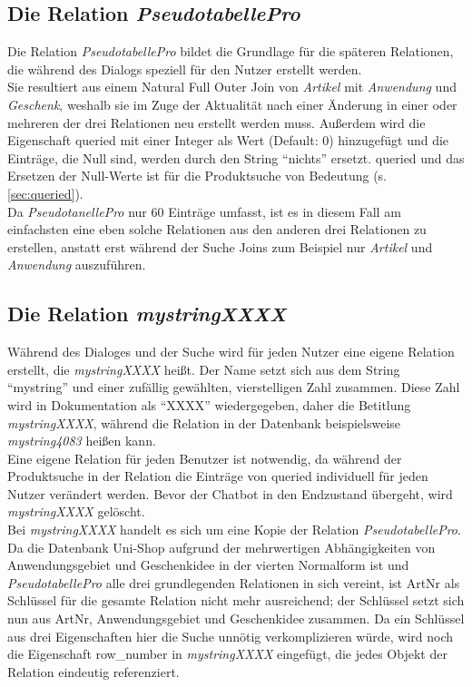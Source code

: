\subsection{Die Relation \textit{PseudotabellePro}}
\label{sec:PseudotabellePro}
Die Relation \textit{PseudotabellePro} bildet die Grundlage für die späteren Relationen, die während des Dialogs speziell für den Nutzer erstellt werden.\\
Sie resultiert aus einem Natural Full Outer Join von \textit{Artikel} mit \textit{Anwendung} und \textit{Geschenk}, weshalb sie im Zuge der Aktualität nach einer Änderung in einer oder mehreren der drei Relationen neu erstellt werden muss. Außerdem wird die Eigenschaft queried mit einer Integer als Wert (Default: 0) hinzugefügt  und die Einträge, die Null sind, werden durch den String "`nichts"' ersetzt. queried und das Ersetzen der Null-Werte ist für die Produktsuche von Bedeutung (s. \ref{sec:queried}).\\
Da \textit{PseudotanellePro} nur 60 Einträge umfasst, ist es in diesem Fall am einfachsten eine eben solche Relationen aus den anderen drei Relationen zu erstellen, anstatt erst während der Suche Joins zum Beispiel nur \textit{Artikel} und \textit{Anwendung} auszuführen.\\


\subsection{Die Relation \textit{mystringXXXX}}
\label{sec:mystring}
Während des Dialoges und der Suche wird für jeden Nutzer eine eigene Relation erstellt, die \textit{mystringXXXX} heißt. Der Name setzt sich aus dem String "`mystring"' und einer zufällig gewählten, vierstelligen Zahl zusammen. Diese Zahl wird in Dokumentation als "`XXXX"' wiedergegeben, daher die Betitlung \textit{mystringXXXX}, während die Relation in der Datenbank beispielsweise \textit{mystring4083} heißen kann.\\
Eine eigene Relation für jeden Benutzer ist notwendig, da während der Produktsuche in der Relation die Einträge von queried individuell für jeden Nutzer verändert werden. Bevor der Chatbot in den Endzustand übergeht, wird \textit{mystringXXXX} gelöscht.\\
Bei \textit{mystringXXXX} handelt es sich um eine Kopie der Relation \textit{PseudotabellePro}. Da die Datenbank Uni-Shop aufgrund der mehrwertigen Abhängigkeiten von Anwendungsgebiet und Geschenkidee in der vierten Normalform ist und \textit{PseudotabellePro} alle drei grundlegenden Relationen in sich vereint, ist ArtNr als Schlüssel für die gesamte Relation nicht mehr ausreichend; der Schlüssel setzt sich nun aus ArtNr, Anwendungsgebiet und Geschenkidee zusammen. Da ein Schlüssel aus drei Eigenschaften hier die Suche unnötig verkomplizieren würde, wird noch die Eigenschaft row\_number in \textit{mystringXXXX} eingefügt, die jedes Objekt der Relation eindeutig referenziert.\\



